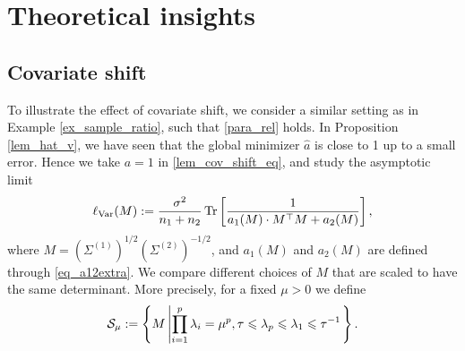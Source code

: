 \section{Theoretical insights}

\subsection{Covariate shift}
\begin{example} %
\label{ex_covshift}
To illustrate the effect of covariate shift, we consider a similar setting as in Example \ref{ex_sample_ratio}, such that \eqref{para_rel} holds. In Proposition \ref{lem_hat_v}, we have seen that the global minimizer $\hat a$ is close to 1 up to a small error. Hence we take $a=1$ in \eqref{lem_cov_shift_eq}, and study the asymptotic limit
$$\ell_{\operatorname{Var}}(M):= \frac{\sigma^2}{n_1+n_2}\operatorname{Tr}\left[  \frac{1}{a_1(M) \cdot M^\top M + a_2(M)  }  \right], $$
where $ M=(\Sigma^{(1)})^{1/2}(\Sigma^{(2)})^{-1/2}$, and $a_1(M)$ and $a_2(M)$ are defined through \eqref{eq_a12extra}.
We compare different choices of $M$ that are scaled to have the same determinant. More precisely, for a fixed $\mu>0$ we define
\begin{align*}
		\cS_{\mu}\define\bigset{M \left| \prod_{i=1}^p \lambda_i = \mu^p, \tau \le \lambda_p \le \lambda_1 \le \tau^{-1}\right.}.
\end{align*}

\end{example}
